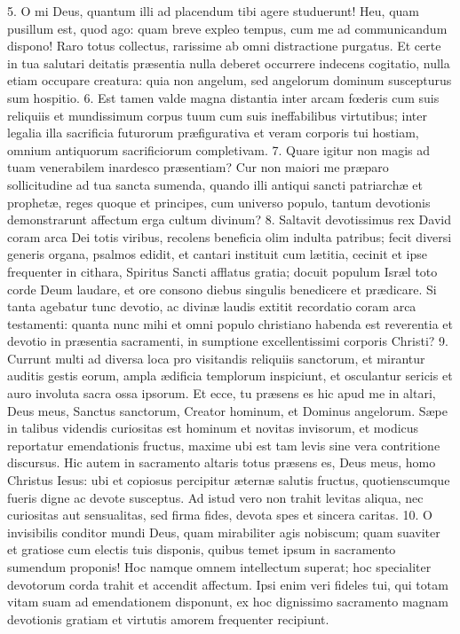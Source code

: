 \documentclass[twoside]{article}
\begin{document}
5. O mi Deus, quantum illi ad placendum tibi agere studuerunt! Heu, quam pusillum est, quod ago: quam breve expleo tempus, cum me ad communicandum dispono! Raro totus collectus, rarissime ab omni distractione purgatus. Et certe in tua salutari deitatis præsentia nulla deberet occurrere indecens cogitatio, nulla etiam occupare creatura: quia non angelum, sed angelorum dominum suscepturus sum hospitio.
6. Est tamen valde magna distantia inter arcam fœderis cum suis reliquiis et mundissimum corpus tuum cum suis ineffabilibus virtutibus; inter legalia illa sacrificia futurorum præfigurativa et veram corporis tui hostiam, omnium antiquorum sacrificiorum completivam.
7. Quare igitur non magis ad tuam venerabilem inardesco præsentiam? Cur non maiori me præparo sollicitudine ad tua sancta sumenda, quando illi antiqui sancti patriarchæ et prophetæ, reges quoque et principes, cum universo populo, tantum devotionis demonstrarunt affectum erga cultum divinum?
8. Saltavit devotissimus rex David coram arca Dei totis viribus, recolens beneficia olim indulta patribus; fecit diversi generis organa, psalmos edidit, et cantari instituit cum lætitia, cecinit et ipse frequenter in cithara, Spiritus Sancti afflatus gratia; docuit populum Isræl toto corde Deum laudare, et ore consono diebus singulis benedicere et prædicare. Si tanta agebatur tunc devotio, ac divinæ laudis extitit recordatio coram arca testamenti: quanta nunc mihi et omni populo christiano habenda est reverentia et devotio in præsentia sacramenti, in sumptione excellentissimi corporis Christi?
9. Currunt multi ad diversa loca pro visitandis reliquiis sanctorum, et mirantur auditis gestis eorum, ampla ædificia templorum inspiciunt, et osculantur sericis et auro involuta sacra ossa ipsorum. Et ecce, tu præsens es hic apud me in altari, Deus meus, Sanctus sanctorum, Creator hominum, et Dominus angelorum. Sæpe in talibus videndis curiositas est hominum et novitas invisorum, et modicus reportatur emendationis fructus, maxime ubi est tam levis sine vera contritione discursus. Hic autem in sacramento altaris totus præsens es, Deus meus, homo Christus Iesus: ubi et copiosus percipitur æternæ salutis fructus, quotienscumque fueris digne ac devote susceptus. Ad istud vero non trahit levitas aliqua, nec curiositas aut sensualitas, sed firma fides, devota spes et sincera caritas.
10. O invisibilis conditor mundi Deus, quam mirabiliter agis nobiscum; quam suaviter et gratiose cum electis tuis disponis, quibus temet ipsum in sacramento sumendum proponis! Hoc namque omnem intellectum superat; hoc specialiter devotorum corda trahit et accendit affectum. Ipsi enim veri fideles tui, qui totam vitam suam ad emendationem disponunt, ex hoc dignissimo sacramento magnam devotionis gratiam et virtutis amorem frequenter recipiunt.
\end{document}
